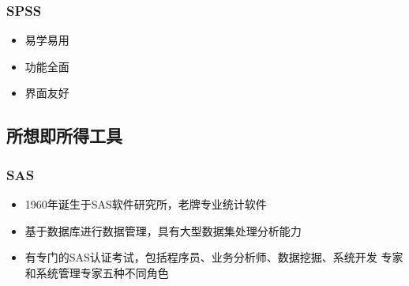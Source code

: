 \subsubsection{SPSS}
\begin{frame}[t]{\subsecname}{\subsubsecname}
  \begin{itemize}
    \item<1-> 易学易用
    \item<2-> 功能全面
    \item<3-> 界面友好
  \end{itemize}

\begin{overlayarea}  {\textwidth}{\textheight}
   
\end{overlayarea}
\end{frame}

\subsection{所想即所得工具}
\subsubsection{SAS}
\begin{frame}[t]{\subsecname}{\subsubsecname}
  \begin{itemize}
    \item<1-> 1960年诞生于SAS软件研究所，老牌专业统计软件
    \item<2-> 基于数据库进行数据管理，具有大型数据集处理分析能力
    \item<3-> 有专门的SAS认证考试，包括程序员、业务分析师、数据挖掘、系统开发
           专家和系统管理专家五种不同角色
  \end{itemize}
  
  \begin{overlayarea} {\textwidth}{\textheight}
  \end{overlayarea}
\end{frame}

